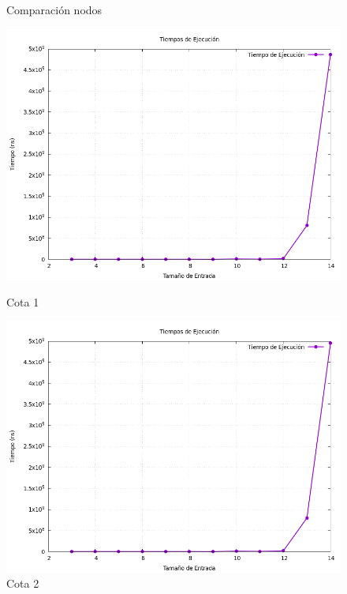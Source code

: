 \documentclass[11pt,openany]{book}
\begin{document}
\begin{figure}[H]
\begin{minipage}{.48\textwidth}
            \caption{Comparación nodos}
            \label{fig:Comparacion nodos}
      \end{minipage}
      \begin{minipage}{.48\textwidth}
        \centering
        \includegraphics[width=1\linewidth]{assets/Img/Cota_1_BB/Cota1_grafico_tiempos.png}
        \caption{Cota 1 }
        \label{fig:Tiempos}
       \end{minipage}
       \begin{minipage}{.48\textwidth}
        \centering
        \includegraphics[width=1\linewidth]{assets/Img/Cota_2_BB/Cota2_grafico_tiempos.png}
        \caption{Cota 2 }
        \label{fig:Tiempos}
       \end{minipage}

\end{figure}
\end{document}

